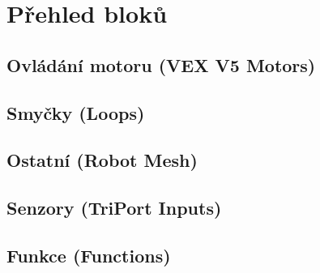 \errata

\newpage

\setcounter{secnumdepth}{3}

\newpage

\newpage

\newpage

\newpage

\newpage

\newpage
\setcounter{secnumdepth}{0}

\newcommand{\where}[1]{{\normalfont (#1)}}

\section{Přehled bloků}

\subsection*{Ovládání motoru \where{VEX V5 Motors}}
\begin{itemize}
	\blockMotorStart
	\blockMotorStop
	\blockMotorDistance
	\blockMotorVelocity
\end{itemize}

\subsection*{Smyčky \where{Loops}}
\begin{itemize}
	\blockLoop
	\blockLoopForever
	\blockLoopWhile
\end{itemize}

\subsection*{Ostatní \where{Robot Mesh}}
\begin{itemize}
	\blockStart
	\blockMotorDone
	\blockWait
	\blockWaitUntil
	\blockComment
\end{itemize}

\subsection*{Senzory \where{TriPort Inputs}}
\begin{itemize}
	\blockBumperPressed
\end{itemize}

\subsection*{Funkce \where{Functions}}
\begin{itemize}
	\blockFunctionDefinition
	\blockFunctionCall
\end{itemize}

